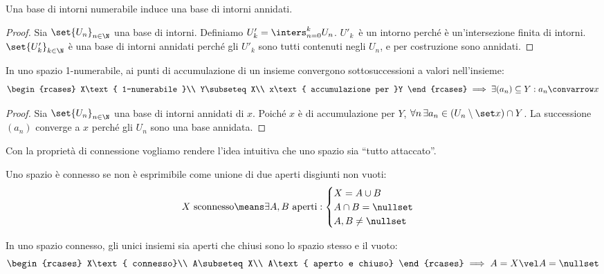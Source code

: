 \begin{prop}
	Una base di intorni numerabile induce una base di intorni annidati.
\end{prop}

\begin{proof}
	Sia $\set{U_n}_{n\in\N}$ una base di intorni.
	Definiamo $U'_k=\inters_{n=0}^kU_n$.
	$U'_k$~è un intorno perché è un'intersezione finita di intorni.
	$\set{U'_k}_{k\in\N}$ è una base di intorni annidati perché gli $U'_k$ sono tutti contenuti negli $U_n$, e per costruzione sono annidati.
\end{proof}

\begin{prop}
	\label{th:1numaccsucc}
	In uno spazio 1-numerabile, ai punti di accumulazione di un insieme convergono sottosuccessioni a valori nell'insieme:
	\[\begin{rcases}
		X\text{ 1-numerabile }\\
		Y\subseteq X\\
		x\text{ accumulazione per }Y
	\end{rcases}\implies
	\exists(a_n)\subseteq Y:a_n\convarrow x\]
\end{prop}

\begin{proof}
	Sia $\set{U_n}_{n\in\N}$ una base di intorni annidati di $x$.
	Poiché $x$ è di accumulazione per $Y$,
	$\forall n\,\exists a_n\in(U_n\setminus\set x)\cap Y$.
	La successione $(a_n)$ converge a $x$ perché gli $U_n$ sono una base annidata.
\end{proof}


Con la proprietà di connessione vogliamo rendere l'idea intuitiva che uno spazio sia ``tutto attaccato''.

\begin{defn}[Connessione]
	Uno spazio è connesso se non è esprimibile come unione di due aperti disgiunti non vuoti:
	\[X\text{ sconnesso}\means
	\exists A,B\text{ aperti}:
	\begin{cases}
		X=A\cup B\\
		A\cap B=\nullset\\
		A,B\neq\nullset
	\end{cases}\]
\end{defn}

\begin{prop}
	\label{th:connapchius}
	In uno spazio connesso, gli unici insiemi sia aperti che chiusi sono lo spazio stesso e il vuoto:
	\[\begin{rcases}
		X\text{ connesso}\\
		A\subseteq X\\
		A\text{ aperto e chiuso}
	\end{rcases}\implies A=X\vel A=\nullset\]
\end{prop}

